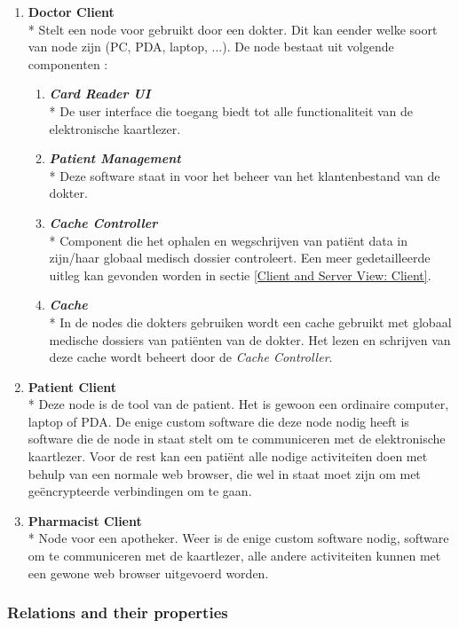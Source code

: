 \documentclass[a4paper,10pt]{article}
\begin{document}
\begin{enumerate}
\item \textbf{Doctor Client}\\*
Stelt een node voor gebruikt door een dokter. Dit kan eender welke soort van node zijn (PC, PDA, laptop, ...). De node bestaat uit volgende componenten : 
\begin{enumerate}
 \item \textit{\textbf{Card Reader UI}}\\*
De user interface die toegang biedt tot alle functionaliteit van de elektronische kaartlezer.
\item \textit{\textbf{Patient Management}}\\*
Deze software staat in voor het beheer van het klantenbestand van de dokter.
\item \textit{\textbf{Cache Controller}}\\*
Component die het ophalen en wegschrijven van patiënt data in zijn/haar globaal medisch dossier controleert. Een meer gedetailleerde uitleg kan gevonden worden in sectie \ref{Client and Server View: Client}.
\item \textit{\textbf{Cache}}\\*
In de nodes die dokters gebruiken wordt een cache gebruikt met globaal medische dossiers van patiënten van de dokter. Het lezen en schrijven van deze cache wordt beheert door de \textit{Cache Controller}.
\end{enumerate}

\item \textbf{Patient Client}\\*
Deze node is de tool van de patient. Het is gewoon een ordinaire computer, laptop of PDA. De enige custom software die deze node nodig heeft is software die de node in staat stelt om te communiceren met de elektronische kaartlezer. Voor de rest kan een patiënt alle nodige activiteiten doen met behulp van een normale web browser, die wel in staat moet zijn om met geëncrypteerde verbindingen om te gaan.

\item \textbf{Pharmacist Client}\\*
Node voor een apotheker. Weer is de enige custom software nodig, software om te communiceren met de kaartlezer, alle andere activiteiten kunnen met een gewone web browser uitgevoerd worden.

\end{enumerate}


\subsubsection*{Relations and their properties}
\end{document}
